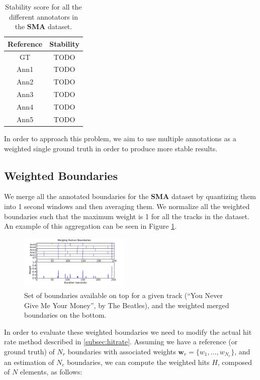 \documentclass{article}
\begin{document}
\begin{table}[h]
  \center
  \begin{tabular}{|c|c|}
    \hline
    Reference & Stability \\
    \hline
    GT      & TODO \\
    Ann1    & TODO \\
    Ann2    & TODO \\
    Ann3    & TODO \\
    Ann4    & TODO \\
    Ann5    & TODO \\
    \hline
  \end{tabular}
  \caption{Stability score for all the different annotators in the \textbf{SMA} dataset.}
  \label{tab:stability-multipleGT}
\end{table}


In order to approach this problem, we aim to use multiple annotations as a weighted single ground truth in order to produce more stable results.

\subsection{Weighted Boundaries}

We merge all the annotated boundaries for the \textbf{SMA} dataset by quantizing them into 1 second windows and then averaging them.
We normalize all the weighted boundaries such that the maximum weight is 1 for all the tracks in the dataset.
An example of this aggregation can be seen in Figure \ref{fig:merging-bounds}.

\begin{figure}
  \centering
  \includegraphics[width=0.47\textwidth]{plots/merging-bounds.pdf}
  \caption{Set of boundaries available on top for a given track (``You Never Give Me Your Money'', by The Beatles), and the weighted merged boundaries on the bottom.}
  \label{fig:merging-bounds}
\end{figure}

In order to evaluate these weighted boundaries we need to modify the actual hit rate method described in \ref{subsec:hitrate}.
Assuming we have a reference (or ground truth) of $N_r$ boundaries with associated weights $\textbf{w}_r = \{w_1, \ldots, w_{N_r}\}$, and an estimation of $N_e$ boundaries, we can compute the weighted hits $H$, composed of $N$ elements, as follows:
\end{document}

